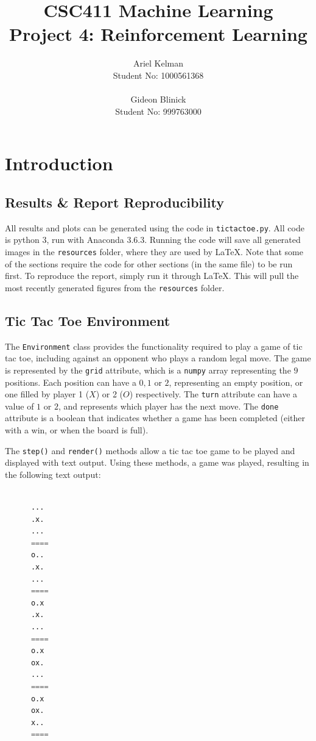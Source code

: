 \documentclass{article}
\title{CSC411 Machine Learning \\ Project 4: Reinforcement Learning}
\author{ Ariel Kelman \\ Student No: 1000561368
         \\ \\
         Gideon Blinick \\ Student No: 999763000 }
\begin{document}
   \maketitle{}


   \section{Introduction}
   \subsection{Results \& Report Reproducibility}
   All results and plots can be generated using the code in \texttt{tictactoe.py}.
   All code is python 3, run with Anaconda 3.6.3.
   Running the code will save all generated images in the \texttt{resources} folder,
   where they are used by \LaTeX. Note that some of the sections require the code for
   other sections (in the same file) to be run first.
   To reproduce the report, simply run it through \LaTeX. This will pull the most recently
   generated figures from the \texttt{resources} folder.

   \subsection{Tic Tac Toe Environment}
   The \texttt{Environment} class provides the functionality required to play a game of tic tac
   toe, including against an opponent who plays a random legal move. The game is represented by the
   \texttt{grid} attribute, which is a \texttt{numpy} array representing the $9$ positions. Each position
   can have a $0, 1$ or $2$, representing an empty position, or one filled by player 1 ($X$) or 2 ($O$)
   respectively. The \texttt{turn} attribute can have a value of $1$ or $2$, and represents which player
   has the next move. The \texttt{done} attribute is a boolean that indicates whether a game has been
   completed (either with a win, or when the board is full).

   The \texttt{step()} and \texttt{render()} methods allow a tic tac toe game to be played and displayed
   with text output. Using these methods, a game was played, resulting in the following text output:
   \begin{lstlisting}[language=Python]

      ...
      .x.
      ...
      ====
      o..
      .x.
      ...
      ====
      o.x
      .x.
      ...
      ====
      o.x
      ox.
      ...
      ====
      o.x
      ox.
      x..
      ====
   \end{lstlisting}
\end{document}
